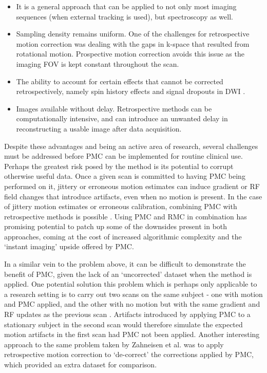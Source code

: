 \documentclass[class=article, crop=false]{standalone}
\begin{document}
\begin{itemize}
	\item It is a general approach that can be applied to not only most imaging sequences (when external tracking is used), but spectroscopy as well. 
	\item Sampling density remains uniform. One of the challenges for retrospective motion correction was dealing with the gaps in k-space that resulted from rotational motion. Prospective motion correction avoids this issue as the imaging FOV is kept constant throughout the scan. 
	\item The ability to account for certain effects that cannot be corrected retrospectively, namely spin history effects \parencite{Yancey2011} and signal dropouts in DWI \parencite{Herbst2012}.
	\item Images available without delay. Retrospective methods can be computationally intensive, and can introduce an unwanted delay in reconstructing a usable image after data acquisition.
\end{itemize}
\par
Despite these advantages and being an active area of research, several challenges must be addressed before PMC can be implemented for routine clinical use. Perhaps the greatest risk posed by the method is its potential to corrupt otherwise useful data. Once a given scan is committed to having PMC being performed on it, jittery or erroneous motion estimates can induce gradient or RF field changes that introduce artifacts, even when no motion is present. In the case of jittery motion estimates or erroneous calibration, combining PMC with retrospective methods is possible \parencite{MacLaren2011,Aksoy2012}. Using PMC and RMC in combination has promising potential to patch up some of the downsides present in both approaches, coming at the cost of increased algorithmic complexity and the `instant imaging' upside offered by PMC.
\par
In a similar vein to the problem above, it can be difficult to demonstrate the benefit of PMC, given the lack of an `uncorrected' dataset when the method is applied. One potential solution this problem which is perhaps only applicable to a research setting is to carry out two scans on the same subject - one with motion and PMC applied, and the other with no motion but with the same gradient and RF updates as the previous scan \parencite{Herbst2012}. Artifacts introduced by applying PMC to a stationary subject in the second scan would therefore simulate the expected motion artifacts in the first scan had PMC not been applied. Another interesting approach to the same problem taken by Zahneisen et al. \parencite*{Zahneisen2016a} was to apply retrospective motion correction to `de-correct' the corrections applied by PMC, which provided an extra dataset for comparison.
\par
\end{document}
